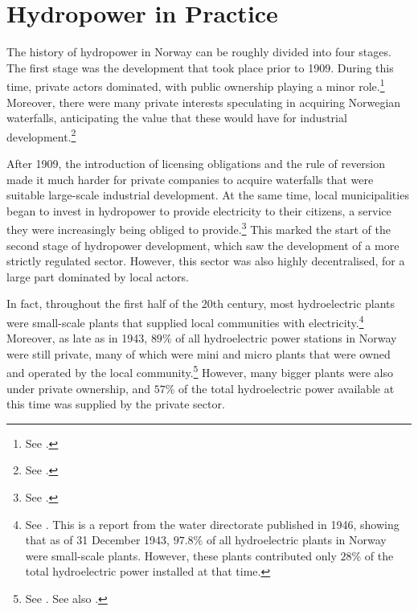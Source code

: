 \section{Hydropower in Practice}\label{sec:4:4}

The history of hydropower in Norway can be roughly divided into four stages. The first stage was the development that took place prior to 1909. During this time, private actors dominated, with public ownership playing a minor role.\footnote{See \cite{otprp61}.} Moreover, there were many private interests speculating in acquiring Norwegian waterfalls, anticipating the value that these would have for industrial development.\footnote{See \cite[30-31]{nou04}.}

After 1909, the introduction of licensing obligations and the rule of reversion made it much harder for private companies to acquire waterfalls that were suitable large-scale industrial development. At the same time, local municipalities began to invest in hydropower to provide electricity to their citizens, a service they were increasingly being obliged to provide.\footnote{See \cite{otprp61}.} This marked the start of the second stage of hydropower development, which saw the development of a more strictly regulated sector. However, this sector was also highly decentralised, for a large part dominated by local actors.

In fact, throughout the first half of the 20th century, most hydroelectric plants were small-scale plants that supplied local communities with electricity.\footnote{See \cite[11]{utbygd46}. This is a report from the water directorate published in 1946, showing that as of 31 December 1943, $97.8 \%$ of all hydroelectric plants in Norway were small-scale plants. However, these plants contributed only $28 \%$ of the total hydroelectric power installed at that time.} Moreover, as late as in 1943, $89 \%$ of all hydroelectric power stations in Norway were still private, many of which were mini and micro plants that were owned and operated by the local community.\footnote{See \cite[6]{utbygd46}. See also \cite[111]{hindrum94}.} However, many bigger plants were also under private ownership, and $57 \%$ of the total hydroelectric power available at this time was supplied by the private sector. 

